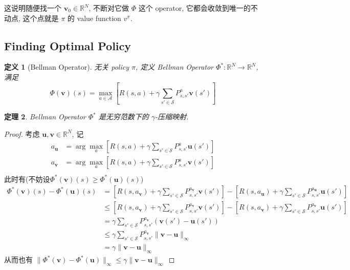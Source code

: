 \documentclass[8pt]{article}
\theoremstyle{compact}
\newtheorem{theorem}{定理}[section]
\newtheorem{definition}[theorem]{定义}
\def\le{\leqslant}
\def\ge{\geqslant}
\begin{document}
这说明随便找一个 $\mathbf v_0 \in \mathbb R^N$, 不断对它做 $\Phi$ 这个 operator, 它都会收敛到唯一的不动点, 这个点就是 $\pi$ 的 value function $v^{\pi}$.

\subsection{Finding Optimal Policy}

\begin{definition}[Bellman Operator]
	无关 policy $\pi$, 定义 Bellman Operator $\Phi^*: \mathbb R^{N} \to \mathbb R^{N}$, 满足 $$\Phi(\mathbf v)(s) = \max_{a \in \mathcal A}\left[R(s, a) + \gamma\sum_{s' \in \mathcal S}P_{s, s'}^a\mathbf v(s')\right]$$
\end{definition}
\begin{theorem}
	Bellman Operator $\Phi^*$ 是无穷范数下的 $\gamma$-压缩映射.
\end{theorem}
\begin{proof}
	考虑 $\mathbf u, \mathbf v \in \mathbb R^N$, 记 \begin{align*}
		a_{\mathbf u} &= \arg\max_a\left[R(s, a) + \gamma\sum_{s' \in \mathcal S}P_{s, s'}^a\mathbf u(s')\right] \\
		a_{\mathbf v} &= \arg\max_a\left[R(s, a) + \gamma\sum_{s' \in \mathcal S}P_{s, s'}^a\mathbf v(s')\right] \\
	\end{align*}
	此时有(不妨设$\Phi^*(\mathbf v)(s) \ge \Phi^*(\mathbf u)(s)$) \begin{align*}
		\Phi^*(\mathbf v)(s) - \Phi^*(\mathbf u)(s) &= \left[R(s, a_{\mathbf v}) + \gamma\sum_{s' \in \mathcal S}P_{s, s'}^{a_{\mathbf v}}\mathbf v(s')\right] - \left[R(s, a_{\mathbf u}) + \gamma\sum_{s' \in \mathcal S}P_{s, s'}^{a_{\mathbf u}}\mathbf u(s')\right] \\
		&\le \left[R(s, a_{\mathbf v}) + \gamma\sum_{s' \in \mathcal S}P_{s, s'}^{a_{\mathbf v}}\mathbf v(s')\right] - \left[R(s, a_{\mathbf v}) + \gamma\sum_{s' \in \mathcal S}P_{s, s'}^{a_{\mathbf v}}\mathbf u(s')\right] \\
		&= \gamma\sum_{s' \in \mathcal S}P_{s, s'}^{a_{\mathbf v}}(\mathbf v(s') - \mathbf u(s')) \\
		&\le \gamma\sum_{s' \in \mathcal S}P_{s, s'}^{a_{\mathbf v}}\|\mathbf v - \mathbf u\|_{\infty} \\
		&= \gamma \|\mathbf v - \mathbf u\|_{\infty}
	\end{align*}
	从而也有 $\|\Phi^*(\mathbf v) - \Phi^*(\mathbf u)\|_{\infty} \le \gamma \|\mathbf v - \mathbf u\|_{\infty}$
\end{proof}
\end{document}
